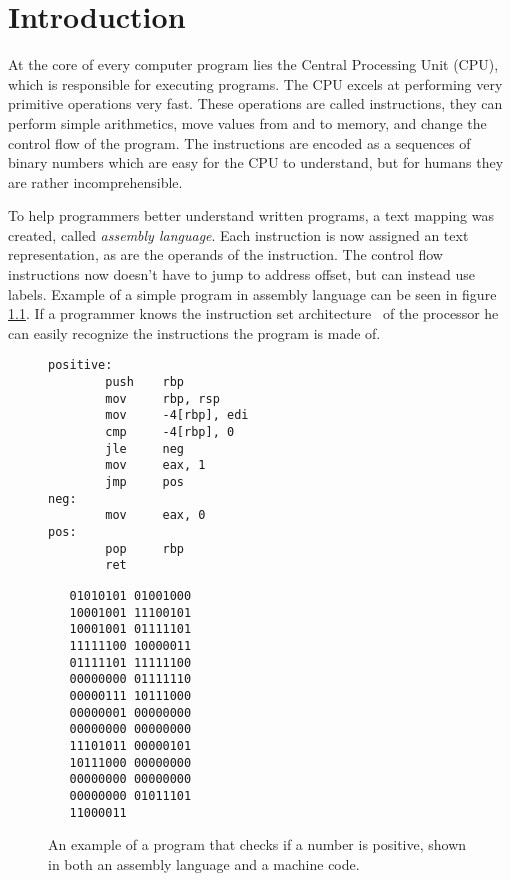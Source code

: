 \chapter{Introduction}
At the core of every computer program lies the Central Processing Unit (CPU),
which is responsible for executing programs. The CPU excels at performing very
primitive operations very fast. These operations are called instructions, they
can perform simple arithmetics, move values from and to memory, and change the
control flow of the program. The instructions are encoded as a sequences of
binary numbers which are easy for the CPU to understand, but for humans they
are rather incomprehensible.

To help programmers better understand written programs, a text mapping was
created, called \textit{assembly language}. Each instruction is now assigned an
text representation, as are the operands of the instruction. The control flow
instructions now doesn't have to jump to address offset, but can instead use
labels. Example of a simple program in assembly language can be seen in figure
\ref{fig:simple-assembly}. If a programmer knows the instruction set
architecture~\cite{isa} of the processor he can easily recognize the
instructions the program is made of.

\begin{figure}
    \begin{minipage}{.45\textwidth}
    \begin{lstlisting}
positive:
        push    rbp
        mov     rbp, rsp
        mov     -4[rbp], edi
        cmp     -4[rbp], 0
        jle     neg
        mov     eax, 1
        jmp     pos
neg:
        mov     eax, 0
pos:
        pop     rbp
        ret
    \end{lstlisting}
    \end{minipage}
    \hfill\vline\hfill
    \begin{minipage}{.45\textwidth}
    \begin{lstlisting}
   01010101 01001000
   10001001 11100101
   10001001 01111101
   11111100 10000011
   01111101 11111100
   00000000 01111110
   00000111 10111000
   00000001 00000000
   00000000 00000000
   11101011 00000101
   10111000 00000000
   00000000 00000000
   00000000 01011101
   11000011
    \end{lstlisting}
    \end{minipage}
    \caption{An example of a program that checks if a number is positive, shown
    in both an assembly language and a machine code.}
    \label{fig:simple-assembly}
\end{figure}

